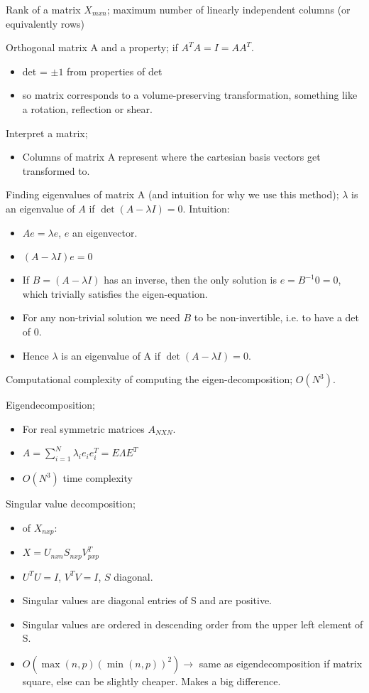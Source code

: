 \documentclass{article}
\begin{document}
Rank of a matrix $X_{mxn}$; maximum number of linearly independent columns (or equivalently rows)

Orthogonal matrix A and a property; if $A^TA=I=AA^T$. \begin{itemize}
	\item det = $\pm 1$ from properties of det
	\item so matrix corresponds to a volume-preserving transformation, something like a rotation, reflection or shear.
\end{itemize}
	
Interpret a matrix; \begin{itemize}
	\item Columns of matrix A represent where the cartesian basis vectors get transformed to.
\end{itemize}

Finding eigenvalues of matrix A (and intuition for why we use this method); $\lambda$ is an eigenvalue of $A$ if $\det(A-\lambda I) = 0$. Intuition:
\begin{itemize}
	\item $Ae=\lambda e$, $e$ an eigenvector.
	\item $(A-\lambda I)e=0$
	\item If $B=(A-\lambda I)$ has an inverse, then the only solution is $e=B^{-1}0 = 0$, which trivially satisfies the eigen-equation.
	\item For any non-trivial solution we need $B$ to be non-invertible, i.e. to have a det of 0.
	\item Hence $\lambda$ is an eigenvalue of A if $\det(A-\lambda I) = 0$.
\end{itemize}

Computational complexity of computing the eigen-decomposition; $O(N^3)$.

Eigendecomposition; \begin{itemize}
	\item For real symmetric matrices $A_{NXN}$.
	\item $A = \sum_{i=1}^N \lambda_i e_i e_i^T = E\Lambda E^T$
	\item $O(N^3)$ time complexity
\end{itemize}

Singular value decomposition; \begin{itemize}
	\item of $X_{nxp}$: 
	\item $X = U_{nxn}S_{nxp}V^T_{pxp}$
	\item $U^TU=I$, $V^TV=I$, $S$ diagonal.
	\item Singular values are diagonal entries of S and are positive. 
	\item Singular values are ordered in descending order from the upper left element of S.
	\item $O(\max(n,p)(\min(n,p))^2) \rightarrow$ same as eigendecomposition if matrix square, else can be slightly cheaper. Makes a big difference.
\end{itemize}
\end{document}
